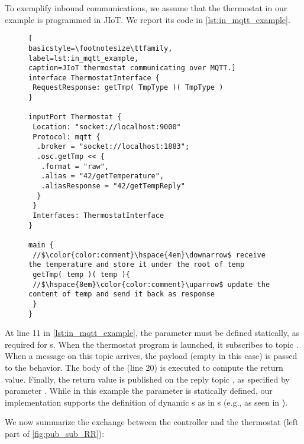 To exemplify inbound  communications, we assume that the
thermostat in our example is programmed in JIoT. We report its code in
\cref{lst:in_mqtt_example}.

\begin{figure}[t]
 \begin{lstlisting}[
basicstyle=\footnotesize\ttfamily,
label=lst:in_mqtt_example,
caption=JIoT thermostat communicating over MQTT.]
interface ThermostatInterface {
 RequestResponse: getTmp( TmpType )( TmpType )
}

inputPort Thermostat {
 Location: "socket://localhost:9000"
 Protocol: mqtt {
  .broker = "socket://localhost:1883";
  .osc.getTmp << {
   .format = "raw",
   .alias = "42/getTemperature",
   .aliasResponse = "42/getTempReply"
  }
 }
 Interfaces: ThermostatInterface
}

main {
 //$\color{color:comment}\hspace{4em}\downarrow$ receive the temperature and store it under the root of temp
 getTmp( temp )( temp ){
 //$\hspace{8em}\color{color:comment}\uparrow$ update the content of temp and send it back as response
 }
}
\end{lstlisting}
\end{figure}

At line 11 in \cref{lst:in_mqtt_example}, the  parameter
must be defined statically, as required for s.
When the thermostat program is launched, it subscribes to topic
. When a message on this topic arrives, the payload
(empty in this case) is passed to the behavior. The body of the
 (line 20) is executed to compute the return value.
Finally, the return value is published on the reply topic
, as specified by  parameter
. While in this example the parameter
 is statically defined, our implementation supports the
definition of dynamic s as in s (e.g.,
as seen in ).

We now summarize the exchange between the controller and the thermostat (left
part of \cref{fig:pub_sub_RR}):


